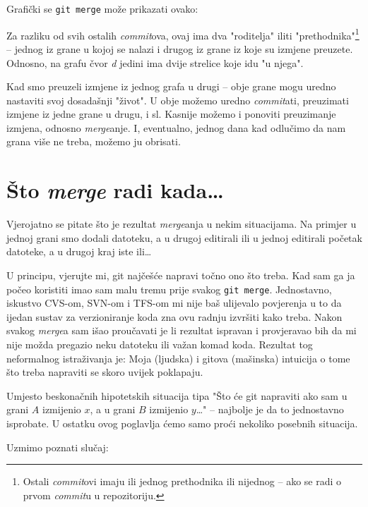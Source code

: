 Grafički se \verb+git merge+ može prikazati ovako:



Za razliku od svih ostalih \emph{commit}ova, ovaj ima dva "roditelja" iliti "prethodnika"\footnote{Ostali \emph{commit}ovi imaju ili jednog prethodnika ili nijednog -- ako se radi o prvom \emph{commit}u u repozitoriju.} -- jednog iz grane u kojoj se nalazi i drugog iz grane iz koje su izmjene preuzete.
Odnosno, na grafu čvor \emph d jedini ima dvije strelice koje idu "u njega".

Kad smo preuzeli izmjene iz jednog grafa u drugi -- obje grane mogu uredno nastaviti svoj dosadašnji "život".
U obje možemo uredno \emph{commit}ati, preuzimati izmjene iz jedne grane u drugu, i sl.
Kasnije možemo i ponoviti preuzimanje izmjena, odnosno \emph{merge}anje.
I, eventualno, jednog dana kad odlučimo da nam grana više ne treba, možemo ju obrisati.

\section*{Što \emph{merge} radi kada\dots}

Vjerojatno se pitate što je rezultat \emph{merge}anja u nekim situacijama.
Na primjer u jednoj grani smo dodali datoteku, a u drugoj editirali ili u jednoj editirali početak datoteke, a u drugoj kraj iste ili\dots

U principu, vjerujte mi, git najčešće napravi točno ono što treba. 
Kad sam ga ja počeo koristiti imao sam malu tremu prije svakog \verb+git merge+.
Jednostavno, iskustvo CVS-om, SVN-om i TFS-om mi nije baš ulijevalo povjerenja u to da ijedan sustav za verzioniranje koda zna ovu radnju izvršiti kako treba.
Nakon svakog \emph{merge}a sam išao proučavati je li rezultat ispravan i provjeravao bih da mi nije možda pregazio neku datoteku ili važan komad koda.
Rezultat tog neformalnog istraživanja je: Moja (ljudska) i gitova (mašinska) intuicija o tome što treba napraviti se skoro uvijek poklapaju.

Umjesto beskonačnih hipotetskih situacija tipa "Što će git napraviti ako sam u grani $A$ izmijenio $x$, a u grani $B$ izmijenio $y$\dots" -- najbolje je da to jednostavno isprobate. 
U ostatku ovog poglavlja ćemo samo proći nekoliko posebnih situacija.

Uzmimo poznati slučaj:



